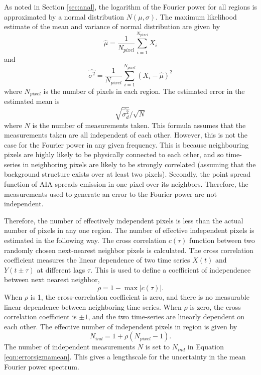 \documentclass{aastex}
\newcommand{\PS}{power spectrum}
\begin{document}
{As noted in Section \ref{sec:anal}, the logarithm of the Fourier power
for all regions is approximated by a normal distribution $N(\mu,
\sigma)$.  The maximum likelihood estimate of the mean and variance of
normal distribution are given by
\begin{equation}
\hat{\mu} = \frac{1}{N_{pixel}}\sum_{i=1}^{N_{pixel}}X_{i}
\label{eqn:mlmean}
\end{equation}
and
\begin{equation}
\hat{\sigma^{2}} = \frac{1}{N_{pixel}}\sum_{i=1}^{N_{pixel}}(X_{i}-\hat{\mu})^{2}
\label{eqn:sigmamean}
\end{equation}
where $N_{pixel}$ is the number of pixels in each region.  The
estimated error in the estimated mean is
\begin{equation}
\sqrt{\hat{\sigma_{d}^{2}}}/\sqrt{N}
\label{eqn:errorsigmamean}
\end{equation}
where $N$ is the number of measurements taken.  This formula assumes
that the measurements taken are all independent of each other.
However, this is not the case for the Fourier power in any given
frequency.  This is because neighbouring pixels are highly likely to
be physically connected to each other, and so time-series in
neighboring pixels are likely to be strongly correlated (assuming that
the background structure exists over at least two pixels).  Secondly,
the point spread function of AIA spreads emission in one pixel over
its neighbors.  Therefore, the measurements used to generate an error
to the Fourier power are not independent.

Therefore, the number of effectively independent pixels is less than
the actual number of pixels in any one region.  The number of
effective independent pixels is estimated in the following way.  The
cross correlation $c(\tau)$ function between two randomly chosen
next-nearest neighbor pixels is calculated.  The cross correlation
coefficient measures the linear dependence of two time series $X(t)$
and $Y(t \pm \tau)$ at different lags $\tau$.  This is used to define
a coefficient of independence between next nearest neighbor,
\begin{equation}
\label{eqn:ind}
\rho = 1 - \max|c(\tau)|.
\end{equation}
When $\rho$ is 1, the cross-correlation coefficient is zero, and there
is no measurable linear dependence between neighboring time series.
When $\rho$ is zero, the cross correlation coefficient is $\pm 1$, and
the two time-series are linearly dependent on each other.  The
effective number of independent pixels in region is given by
\begin{equation}
\label{eqn:nind}
N_{ind}= 1 + \rho(N_{pixel}-1).
\end{equation}
The number of independent measurements $N$ is set to $N_{ind}$ in
Equation \ref{eqn:errorsigmamean}.  This gives a lengthscale for the
uncertainty in the mean Fourier \PS.

}
\end{document}
